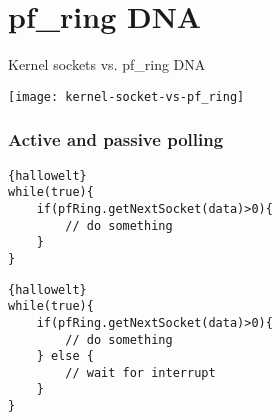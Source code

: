 \section{pf\_ring DNA}

\begin{frame}{Kernel sockets vs. pf\_ring DNA}{}
	\begin{center} 
		\texttt{[image: kernel-socket-vs-pf\_ring]}
	\end{center} 
\end{frame}

\begin{frame}[fragile]
\frametitle{Active and passive polling}
\begin{lstlisting}[frame=trBL,caption={}]{hallowelt}
while(true){
    if(pfRing.getNextSocket(data)>0){
        // do something
    }
}
\end{lstlisting}


\begin{lstlisting}[frame=trBL,caption={}]{hallowelt}
while(true){
    if(pfRing.getNextSocket(data)>0){
        // do something
    } else {
        // wait for interrupt
    }
}
\end{lstlisting}
\end{frame}